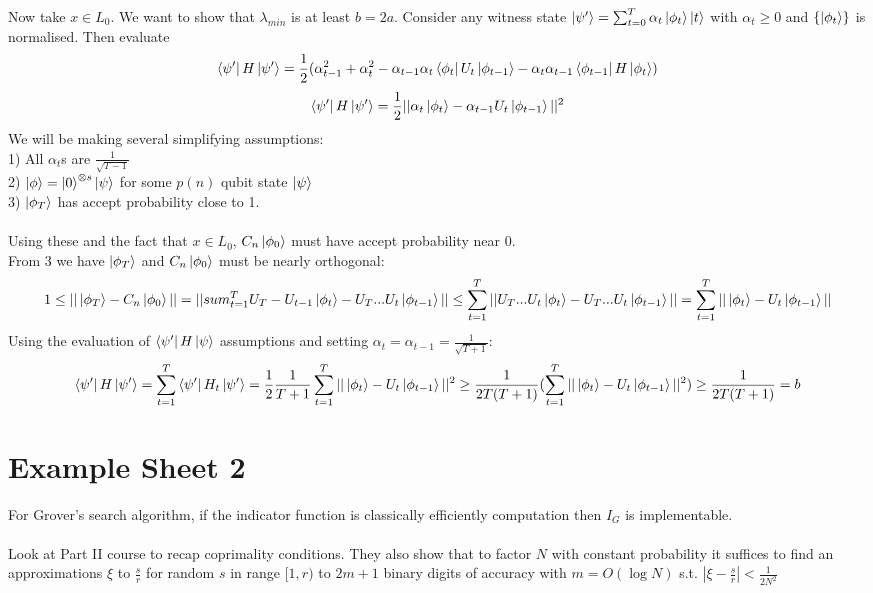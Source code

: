 \documentclass{article}
\begin{document}
                       Now take $x \in L_0$. We want to show that $\lambda_{min}$ is at least $b=2a$. Consider any witness state $\ket{\psi'}= \sum_{t=0}^T \alpha_t \ket{\phi_t} \ket{t}$ with $\alpha_t \geq 0$ and $\{ \ket{\phi_t}\}$ is normalised. Then evaluate $$\bra{\psi'} H \ket{\psi'} = \frac{1}{2} ( \alpha^2_{t-1} + \alpha_t^2 - \alpha_{t-1} \alpha_t \bra{\phi_t} U_t \ket{\phi_{t-1}} - \alpha_t \alpha_{t-1} \bra{\phi_{t-1}} H \ket{\phi_t})$$
                       $$
                       \bra{\psi'} H \ket{\psi'} = \frac{1}{2} || \alpha_t \ket{\phi_t} - \alpha_{t-1} U_t \ket{\phi_{t-1}} ||^2
                       $$
                       We will be making several simplifying assumptions:\\
                       1) All $\alpha_t$s are $\frac{1}{\sqrt{T-1}}$\\
                       2) $\ket{\phi} = \ket{0}^{\otimes s} \ket{\psi}$ for some $p(n)$ qubit state $\ket{\psi}$\\
                       3) $\ket{\phi_T}$ has accept probability close to 1.\\\\
                       Using these and the fact that $x \in L_0$, $C_n \ket{\phi_0}$ must have accept probability near 0.\\
                       From 3 we have $\ket{\phi_T}$ and $C_n \ket{\phi_0}$ must be nearly orthogonal:
                       $$
                       1 \leq || \ket{\phi_T} - C_n \ket{\phi_0} || = || sum_{t=1}^T U_T - U_{t-1} \ket{\phi_t} - U_T...U_t\ket{\phi_{t-1}}|| \leq \sum_{t=1}^T || U_T...U_t \ket{\phi_t} - U_T...U_t \ket{\phi_{t-1}}|| = \sum_{t=1}^T || \ket{\phi_t} - U_t \ket{\phi_{t-1}}||
                       $$
                       Using the evaluation of $\bra{\psi'} H \ket{\psi}$ assumptions and setting $\alpha_t = \alpha_{t-1} = \frac{1}{\sqrt{T+1}}$:
                               $$
                               \bra{\psi'} H \ket{\psi'} = \sum_{t=1}^T \bra{\psi'} H_t \ket{\psi'} = \frac{1}{2} \frac{1}{T+1} \sum_{t=1}^T ||\ket{\phi_t} - U_t \ket{\phi_{t-1}} ||^2 \geq \frac{1}{2T(T+1)} ( \sum_{t=1}^T || \ket{\phi_t} - U_t \ket{\phi_{t-1}}||^2 ) \geq \frac{1}{2T(T+1)} = b
                               $$
                               \section{Example Sheet 2}
For Grover's search algorithm, if the indicator function is classically efficiently computation then $I_G$ is implementable.\\\\
Look at Part II course to recap coprimality conditions. They also show that to factor $N$ with constant probability it suffices to find an approximations $\xi$ to $\frac{s}{r}$ for random $s$ in range $[1,r)$ to $2m+1$ binary digits of accuracy with $m= O(\log N)$ s.t. $| \xi - \frac{s}{r} | < \frac{1}{2N^2}$\\\\
\end{document}
